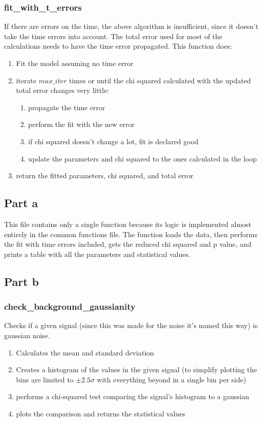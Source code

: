 \subsubsection{fit\_with\_t\_errors}
If there are errors on the time, the above algorithm is insufficient, since it doesn't take the time errors into account. The total error used for most of the calculations needs to have the time error propagated. This function does:
\begin{enumerate}
    \item Fit the model assuming no time error 
    \item iterate \(max\_iter\) times or until the chi squared calculated with the updated total error changes very little:
    \begin{enumerate}
        \item propagate the time error
        \item perform the fit with the new error
        \item if chi squared doesn't change a lot, fit is declared good
        \item update the parameters and chi squared to the ones calculated in the loop
    \end{enumerate}
    \item return the fitted parameters, chi squared, and total error
\end{enumerate}
\subsection{Part a}
This file contains only a single function because its logic is implemented almost entirely in the common functions file. The function loads the data, then performs the fit with time errors included, gets the reduced chi squared and p value, and prints a table with all the parameters and statistical values.
\subsection{Part b}
\subsubsection{check\_background\_gaussianity}
Checks if a given signal (since this was made for the noise it's named this way) is gaussian noise. 
\begin{enumerate}
    \item Calculates the mean and standard deviation
    \item Creates a histogram of the values in the given signal (to simplify plotting the bins are limited to \(\pm2.5\sigma\) with everything beyond in a single bin per side)
    \item performs a chi-squared test comparing the signal's histogram to a gaussian 
    \item plots the comparison and returns the statistical values
\end{enumerate}
